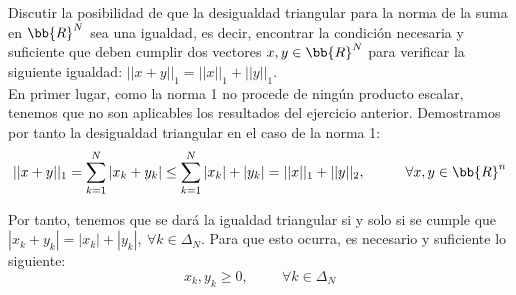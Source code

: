 \begin{ejercicio}
    Discutir la posibilidad de que la desigualdad triangular para la norma de la suma en $\bb{R}^N$ sea una igualdad, es decir, encontrar la condición necesaria y suﬁciente que deben cumplir dos vectores $x, y \in \bb{R}^N$ para veriﬁcar la siguiente igualdad: $ ||x + y||_1 =|| x||_1 +|| y||_1$.\\

    En primer lugar, como la norma 1 no procede de ningún producto escalar, tenemos que no son aplicables los resultados del ejercicio anterior. Demostramos por tanto la desigualdad triangular en el caso de la norma 1:
    \begin{equation*}
        ||x+y||_1 = \sum_{k=1}^N |x_k + y_k| \leq \sum_{k=1}^N |x_k| + |y_k| = ||x||_1 + ||y||_2, \hspace{1cm} \forall x,y\in \bb{R}^n
    \end{equation*}

    Por tanto, tenemos que se dará la igualdad triangular si y solo si se cumple que $|x_k + y_k| = |x_k| + |y_k|,~\forall k\in \Delta_N$. Para que esto ocurra, es necesario y suficiente lo siguiente: $$x_k, y_k\geq 0,\hspace{1cm} \forall k\in \Delta_N$$
\end{ejercicio}

